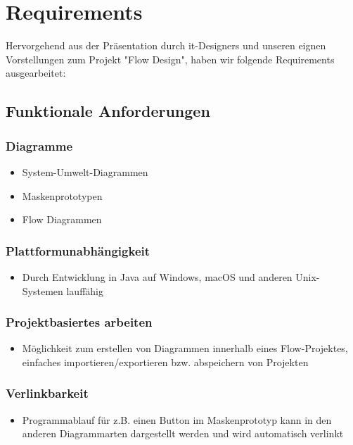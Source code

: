 \section{Requirements}
Hervorgehend aus der Präsentation durch it-Designers und unseren eignen Vorstellungen zum Projekt "Flow Design", haben wir folgende Requirements ausgearbeitet:

\subsection{Funktionale Anforderungen}

\subsubsection{Diagramme}
\begin{itemize}
	\item System-Umwelt-Diagrammen
	\item Maskenprototypen
	\item Flow Diagrammen
\end{itemize}

\subsubsection{Plattformunabhängigkeit}
\begin{itemize}
	\item Durch Entwicklung in Java auf Windows, macOS und anderen Unix-Systemen lauffähig
\end{itemize}

\subsubsection{Projektbasiertes arbeiten}
\begin{itemize}
	\item Möglichkeit zum erstellen von Diagrammen innerhalb eines Flow-Projektes, einfaches importieren/exportieren bzw. abspeichern von Projekten
\end{itemize}

\subsubsection{Verlinkbarkeit}
\begin{itemize}
	\item Programmablauf für z.B. einen Button im Maskenprototyp kann in den anderen Diagrammarten dargestellt werden und wird automatisch verlinkt 
\end{itemize}

